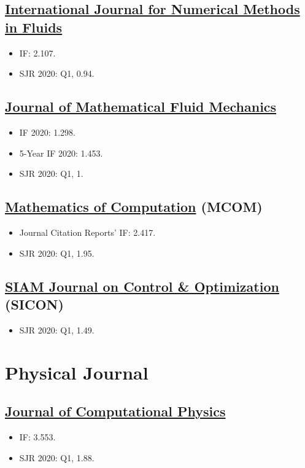 \documentclass{article}
\numberwithin{equation}{section}
\begin{document}
\subsection{\href{https://onlinelibrary.wiley.com/journal/10970363}{International Journal for Numerical Methods in Fluids}}
\begin{itemize}
	\item IF: 2.107.
	\item SJR 2020: Q1, 0.94.
\end{itemize}

\subsection{\href{https://www.springer.com/journal/21}{Journal of Mathematical Fluid Mechanics}}
\begin{itemize}
	\item IF 2020: 1.298.
	\item 5-Year IF 2020: 1.453.
	\item SJR 2020: Q1, 1.
\end{itemize}

\subsection{\href{https://www.ams.org/publications/journals/journalsframework/mcom}{Mathematics of Computation} (MCOM)}
\begin{itemize}
	\item Journal Citation Reports' IF: 2.417.
	\item SJR 2020: Q1, 1.95.
\end{itemize}

\subsection{\href{https://www.siam.org/publications/journals/siam-journal-on-control-and-optimization-sicon}{SIAM Journal on Control \& Optimization} (SICON)}
\begin{itemize}
	\item SJR 2020: Q1, 1.49.
\end{itemize}

\section{Physical Journal}

\subsection{\href{https://www.journals.elsevier.com/journal-of-computational-physics}{Journal of Computational Physics}}
\begin{itemize}
	\item IF: 3.553.
	\item SJR 2020: Q1, 1.88.
\end{itemize}


\printbibliography[heading=bibintoc]
\end{document}
